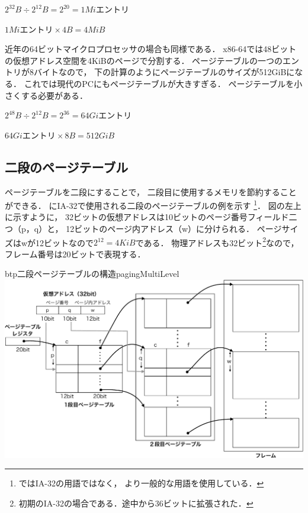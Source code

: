 \centerline{$2^{32}B \div 2^{12}B = 2^{20} = 1Miエントリ$}
\centerline{$1Miエントリ \times 4B = 4MiB$}

近年の64ビットマイクロプロセッサの場合も同様である．
x86-64では48ビットの仮想アドレス空間を4KiBのページで分割する．
ページテーブルの一つのエントリが8バイトなので，
下の計算のようにページテーブルのサイズが512GiBになる．
これでは現代のPCにもページテーブルが大きすぎる．
ページテーブルを小さくする必要がある．

\centerline{$2^{48}B \div 2^{12}B = 2^{36} = 64Giエントリ$}
\centerline{$64Giエントリ \times 8B = 512GiB$}

\subsection{二段のページテーブル}
ページテーブルを二段にすることで，
二段目に使用するメモリを節約することができる．
にIA-32で使用される二段のページテーブルの例を示す
\footnote{ではIA-32の用語ではなく，
  より一般的な用語を使用している．}．
図の左上に示すように，
32ビットの仮想アドレスは10ビットのページ番号フィールド二つ（p，q）と，
12ビットのページ内アドレス（w）に分けられる．
ページサイズはwが12ビットなので$2^{12}=4KiB$である．
物理アドレスも32ビット\footnote{
  初期のIA-32の場合である．途中から36ビットに拡張された．
}なので，フレーム番号は20ビットで表現する．

\begin{myfig}{btp}{二段ページテーブルの構造}{pagingMultiLevel}
  \includegraphics[scale=0.5]{Fig/pagingMultiLevel-crop.pdf}
\end{myfig}


